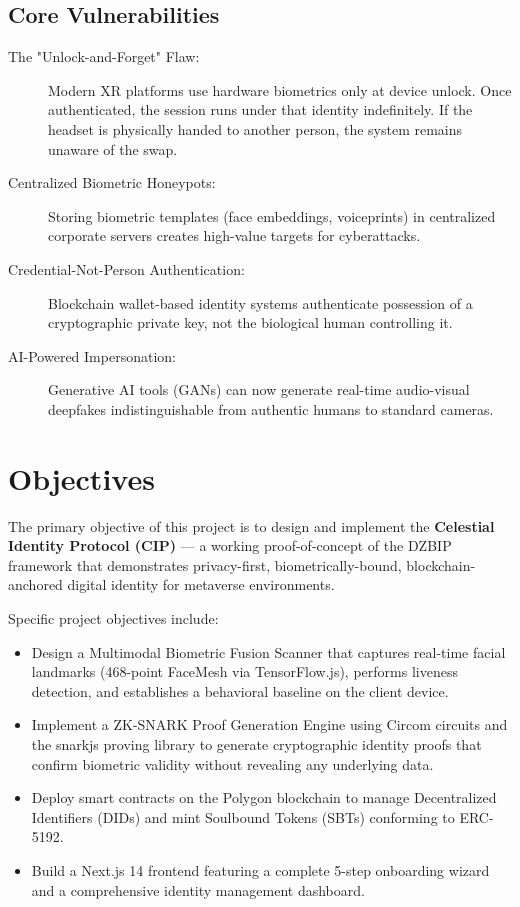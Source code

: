\documentclass[12pt,a4paper,oneside]{report}
\begin{document}
\subsection{Core Vulnerabilities}
\begin{description}
    \item[The "Unlock-and-Forget" Flaw:] Modern XR platforms use hardware biometrics only at device unlock. Once authenticated, the session runs under that identity indefinitely. If the headset is physically handed to another person, the system remains unaware of the swap.
    \item[Centralized Biometric Honeypots:] Storing biometric templates (face embeddings, voiceprints) in centralized corporate servers creates high-value targets for cyberattacks.
    \item[Credential-Not-Person Authentication:] Blockchain wallet-based identity systems authenticate possession of a cryptographic private key, not the biological human controlling it.
    \item[AI-Powered Impersonation:] Generative AI tools (GANs) can now generate real-time audio-visual deepfakes indistinguishable from authentic humans to standard cameras.
\end{description}

\section{Objectives}
The primary objective of this project is to design and implement the \textbf{Celestial Identity Protocol (CIP)} --- a working proof-of-concept of the DZBIP framework that demonstrates privacy-first, biometrically-bound, blockchain-anchored digital identity for metaverse environments.

Specific project objectives include:
\begin{itemize}
    \item Design a Multimodal Biometric Fusion Scanner that captures real-time facial landmarks (468-point FaceMesh via TensorFlow.js), performs liveness detection, and establishes a behavioral baseline on the client device.
    \item Implement a ZK-SNARK Proof Generation Engine using Circom circuits and the snarkjs proving library to generate cryptographic identity proofs that confirm biometric validity without revealing any underlying data.
    \item Deploy smart contracts on the Polygon blockchain to manage Decentralized Identifiers (DIDs) and mint Soulbound Tokens (SBTs) conforming to ERC-5192.
    \item Build a Next.js 14 frontend featuring a complete 5-step onboarding wizard and a comprehensive identity management dashboard.
\end{itemize}
\end{document}
